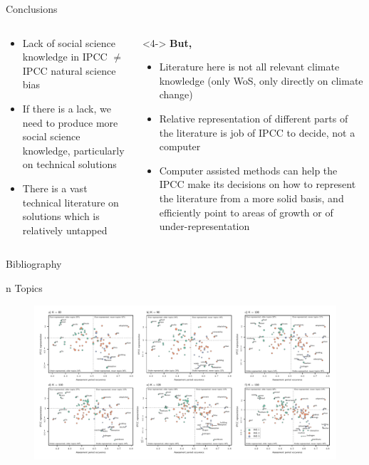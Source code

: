 \documentclass[9pt, aspectratio=169]{beamer}
\begin{document}
\begin{frame}{Conclusions}
\begin{columns}[t]
	\begin{column}{0.618\linewidth}
		\begin{itemize}
			\item<1-> Lack of social science knowledge in IPCC $ \neq $ IPCC natural science bias
			\item<2-> If there is a lack, we need to produce more social science knowledge, particularly on technical solutions
			\item<3-> There is a vast technical literature on solutions which is relatively untapped
		\end{itemize}
	\end{column}
	\begin{column}{0.382\linewidth}<4->
		\textbf{But,}
		\begin{itemize}
			\item<4-> Literature here is not all relevant climate knowledge (only WoS, only directly on climate change)
			\item<5-> Relative representation of different parts of the literature is job of IPCC to decide, not a computer
		\end{itemize}
		\begin{itemize}
			\item<6-> Computer assisted methods can help the IPCC make its decisions on how to represent the literature from a more solid basis, and efficiently point to areas of growth or of under-representation
		\end{itemize}
	\end{column}
\end{columns}
\end{frame}


\begin{frame}{Bibliography}
\scriptsize

\end{frame}




\appendix


\begin{frame}{n Topics}
\vspace{-0.4cm}
\begin{figure}
	\includegraphics[width=1\linewidth]{../plots_pub/topic_rep_ks_wide.pdf}
\end{figure}

\end{frame}

\end{document}
